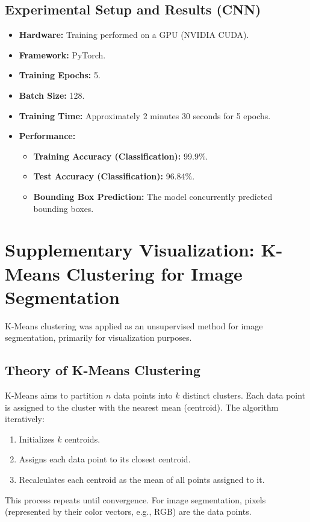 \documentclass[11pt, a4paper]{article}
\begin{document}
\subsection{Experimental Setup and Results (CNN)}
\begin{itemize}
    \item \textbf{Hardware:} Training performed on a GPU (NVIDIA CUDA).
    \item \textbf{Framework:} PyTorch.
    \item \textbf{Training Epochs:} 5.
    \item \textbf{Batch Size:} 128.
    \item \textbf{Training Time:} Approximately 2 minutes 30 seconds for 5 epochs.
    \item \textbf{Performance:}
        \begin{itemize}
            \item \textbf{Training Accuracy (Classification):} 99.9\%.
            \item \textbf{Test Accuracy (Classification):} 96.84\%.
            \item \textbf{Bounding Box Prediction:} The model concurrently predicted bounding boxes.
        \end{itemize}
\end{itemize}

\section{Supplementary Visualization: K-Means Clustering for Image Segmentation}
K-Means clustering was applied as an unsupervised method for image segmentation, primarily for visualization purposes.

\subsection{Theory of K-Means Clustering}
K-Means aims to partition $n$ data points into $k$ distinct clusters. Each data point is assigned to the cluster with the nearest mean (centroid). The algorithm iteratively:
\begin{enumerate}
    \item Initializes $k$ centroids.
    \item Assigns each data point to its closest centroid.
    \item Recalculates each centroid as the mean of all points assigned to it.
\end{enumerate}
This process repeats until convergence. For image segmentation, pixels (represented by their color vectors, e.g., RGB) are the data points.
\end{document}
